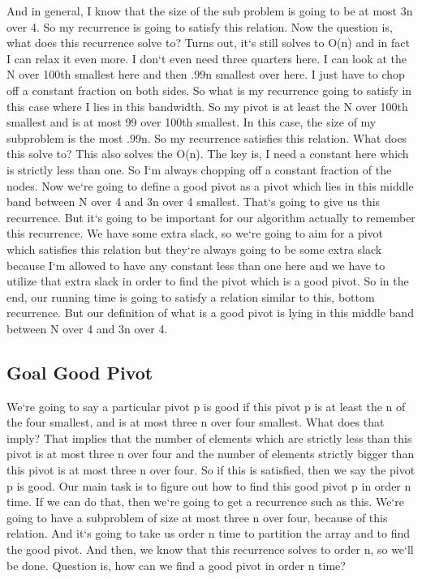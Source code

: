 And in general, I know that the size of the sub problem is going to be at most 3n over 4.
So my recurrence is going to satisfy this relation.
Now the question is, what does this recurrence solve to? Turns out, it`s still solves to O(n) and in fact I can relax it even more.
I don`t even need three quarters here.
I can look at the N over 100th smallest here and then .99n smallest over here.
I just have to chop off a constant fraction on both sides.
So what is my recurrence going to satisfy in this case where I lies in this bandwidth.
So my pivot is at least the N over 100th smallest and is at most 99 over 100th smallest.
In this case, the size of my subproblem is the most .99n.
So my recurrence satisfies this relation.
What does this solve to? This also solves the O(n).
The key is, I need a constant here which is strictly less than one.
So I`m always chopping off a constant fraction of the nodes.
Now we`re going to define a good pivot as a pivot which lies in this middle band between N over 4 and 3n over 4 smallest.
That`s going to give us this recurrence.
But it`s going to be important for our algorithm actually to remember this recurrence.
We have some extra slack, so we`re going to aim for a pivot which satisfies this relation but they`re always going to be some extra slack because I`m allowed to have any constant less than one here and we have to utilize that extra slack in order to find the pivot which is a good pivot.
So in the end, our running time is going to satisfy a relation similar to this, bottom recurrence.
But our definition of what is a good pivot is lying in this middle band between N over 4 and 3n over 4.

\subsection{Goal  Good Pivot}
We`re going to say a particular pivot p is good if this pivot p is at least the n of the four smallest, and is at most three n over four smallest.
What does that imply? That implies that the number of elements which are strictly less than this pivot is at most three n over four and the number of elements strictly bigger than this pivot is at most three n over four.
So if this is satisfied, then we say the pivot p is good.
Our main task is to figure out how to find this good pivot p in order n time.
If we can do that, then we`re going to get a recurrence such as this.
We`re going to have a subproblem of size at most three n over four, because of this relation.
And it`s going to take us order n time to partition the array and to find the good pivot.
And then, we know that this recurrence solves to order n, so we`ll be done.
Question is, how can we find a good pivot in order n time?

